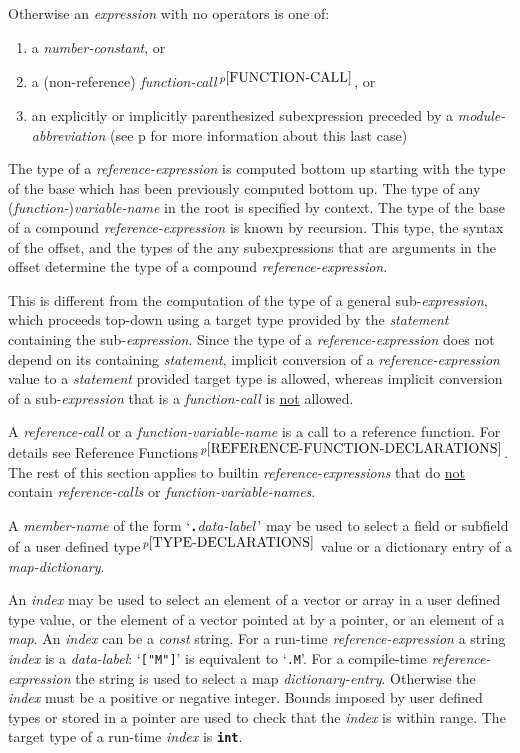 \documentclass[12pt]{article}
\newcommand{\TT}[1]{{\tt \bfseries #1}}
\newcommand{\pagref}[1]{p\pageref{#1}}
\newcommand{\pagnote}[1]{$\,^{p\pageref{#1}}$}
\newenvironment{indpar}[1][0.3in]%
	{\begin{list}{}%
		     {\setlength{\itemsep}{0in}%
		      \setlength{\topsep}{0in}%
		      \setlength{\parsep}{1ex}%
		      \setlength{\labelwidth}{#1}%
		      \setlength{\leftmargin}{#1}%
		      \addtolength{\leftmargin}{\labelsep}}%
	 \item}%
	{\end{list}}
\begin{document}
\begin{indpar}
\begin{itemize}
Otherwise an {\em expression} with no operators is one of:
\begin{enumerate}
\item a {\em number-constant}, or
\item
a (non-reference) {\em function-call}\pagnote{FUNCTION-CALL}, or
\item
an explicitly or implicitly parenthesized subexpression
preceded by a {\em module-abbreviation}
(see \pagref{MA-SYNTACTIC-SUGAR} for more information about this last case)
\end{enumerate}
\end{itemize}
\end{indpar}

The type of a {\em reference-expression} is computed bottom up starting
with the type of the base which has been previously computed bottom up.
The type of any ({\em function-}){\em variable-name} in the root
is specified by context.
The type
of the base of a compound {\em reference-expression} is known by
recursion.  This type, the syntax of the offset, and the
types of the any subexpressions that are arguments in the offset
determine the type of a compound {\em reference-expression}.

This is different from the computation of the type of a general
sub-{\em expression}, which proceeds top-down using a target type
provided by the {\em statement} containing the sub-{\em expression}.
Since the type of a {\em reference-expression} does not depend on
its containing {\em statement}, implicit conversion of a
{\em reference-expression} value to a {\em statement} provided
target type is allowed, whereas implicit conversion
of a sub-{\em expression} that is a {\em function-call}
is \underline{not} allowed.

A {\em reference-call} or a {\em function-variable-name}
is a call to a reference function.
For details see Reference Functions\pagnote{REFERENCE-FUNCTION-DECLARATIONS}.
The rest of this section applies to builtin {\em reference-expressions}
that do \underline{not} contain
{\em reference-calls} or {\em function-variable-names}.

A {\em member-name} of the form `\TT{.}{\em data-label}\,'
may be used to select a field or subfield\label{FIELD-SELECTION}
of a user defined type\pagnote{TYPE-DECLARATIONS} value or
a dictionary entry of a {\em map-dictionary}.

An {\em index} may be used to select an element of a vector
or array in a
user defined type value, or the
element of a vector pointed at by a pointer, or an element
of a {\em map}.  An {\em index} can be a {\em const}
string.  For a run-time {\em reference-expression} a string
{\em index} is a {\em data-label}: `{\tt ["M"]}' is equivalent
to `{\tt .M}'.  For a compile-time {\em reference-expression}
the string is used to select a map {\em dictionary-entry}.
Otherwise the
{\em index} must be a positive or negative integer.  Bounds imposed
by user defined types or stored in a pointer are used to
check that the {\em index} is within range.
The target type of a run-time {\em index} is \TT{int}.
\end{document}
